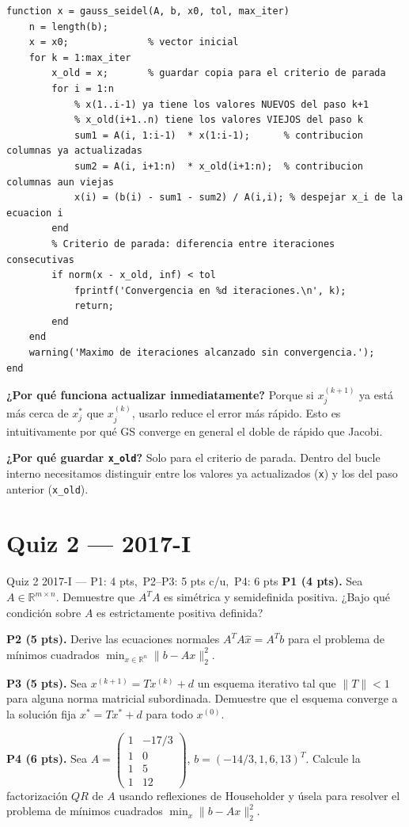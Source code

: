 \documentclass[11pt,a4paper]{article}
\begin{document}
\begin{lstlisting}[caption={Método de Gauss-Seidel (Matlab)}]
function x = gauss_seidel(A, b, x0, tol, max_iter)
    n = length(b);
    x = x0;              % vector inicial
    for k = 1:max_iter
        x_old = x;       % guardar copia para el criterio de parada
        for i = 1:n
            % x(1..i-1) ya tiene los valores NUEVOS del paso k+1
            % x_old(i+1..n) tiene los valores VIEJOS del paso k
            sum1 = A(i, 1:i-1)  * x(1:i-1);      % contribucion columnas ya actualizadas
            sum2 = A(i, i+1:n)  * x_old(i+1:n);  % contribucion columnas aun viejas
            x(i) = (b(i) - sum1 - sum2) / A(i,i); % despejar x_i de la ecuacion i
        end
        % Criterio de parada: diferencia entre iteraciones consecutivas
        if norm(x - x_old, inf) < tol
            fprintf('Convergencia en %d iteraciones.\n', k);
            return;
        end
    end
    warning('Maximo de iteraciones alcanzado sin convergencia.');
end
\end{lstlisting}

\textbf{¿Por qué funciona actualizar inmediatamente?} Porque si $x_j^{(k+1)}$ ya está más cerca de $x_j^*$ que $x_j^{(k)}$, usarlo reduce el error más rápido. Esto es intuitivamente por qué GS converge en general el doble de rápido que Jacobi.

\textbf{¿Por qué guardar \texttt{x\_old}?} Solo para el criterio de parada. Dentro del bucle interno necesitamos distinguir entre los valores ya actualizados (\texttt{x}) y los del paso anterior (\texttt{x\_old}).

\section{Quiz 2 --- 2017-I}

\begin{examen}{Quiz 2 2017-I --- P1: 4 pts,\ P2--P3: 5 pts c/u,\ P4: 6 pts}
\textbf{P1 (4 pts).} Sea $A\in\mathbb{R}^{m\times n}$. Demuestre que $A^TA$ es simétrica y semidefinida positiva. ¿Bajo qué condición sobre $A$ es estrictamente positiva definida?

\smallskip\textbf{P2 (5 pts).} Derive las ecuaciones normales $A^TA\hat x=A^Tb$ para el problema de mínimos cuadrados $\min_{x\in\mathbb{R}^n}\|b-Ax\|_2^2$.

\smallskip\textbf{P3 (5 pts).} Sea $x^{(k+1)}=Tx^{(k)}+d$ un esquema iterativo tal que $\|T\|<1$ para alguna norma matricial subordinada. Demuestre que el esquema converge a la solución fija $x^*=Tx^*+d$ para todo $x^{(0)}$.

\smallskip\textbf{P4 (6 pts).} Sea $A=\begin{pmatrix}1&-17/3\\1&0\\1&5\\1&12\end{pmatrix}$, $b=(-14/3,1,6,13)^T$. Calcule la factorización $QR$ de $A$ usando reflexiones de Householder y úsela para resolver el problema de mínimos cuadrados $\min_x\|b-Ax\|_2^2$.
\end{examen}
\end{document}
